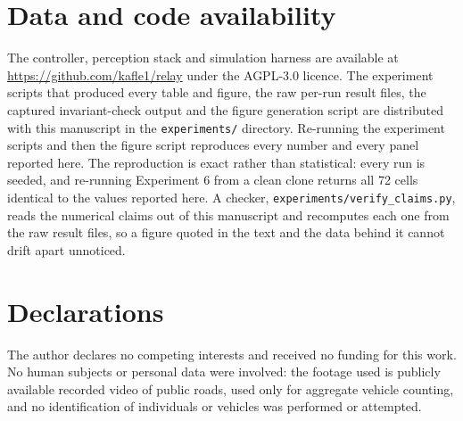 \documentclass[journal]{IEEEtran}
\begin{document}
\section*{Data and code availability}

The controller, perception stack and simulation harness are available at
\url{https://github.com/kafle1/relay} under the AGPL-3.0 licence. The experiment scripts that
produced every table and figure, the raw per-run result files, the captured invariant-check output
and the figure generation script are distributed with this manuscript in the \texttt{experiments/}
directory. Re-running the experiment scripts and then the figure script reproduces every number and
every panel reported here. The reproduction is exact rather than statistical: every run is seeded,
and re-running Experiment 6 from a clean clone returns all 72 cells identical to the values reported
here. A checker, \texttt{experiments/verify\_claims.py}, reads the numerical claims out of this
manuscript and recomputes each one from the raw result files, so a figure quoted in the text and the
data behind it cannot drift apart unnoticed.

\section*{Declarations}

The author declares no competing interests and received no funding for this work. No human subjects
or personal data were involved: the footage used is publicly available recorded video of public
roads, used only for aggregate vehicle counting, and no identification of individuals or vehicles was
performed or attempted.



\end{document}

